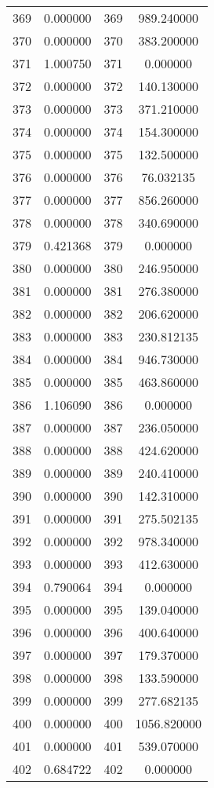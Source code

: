 \documentclass[12pt]{article}
\begin{document}
\begin{longtable}{@{}cccc@{}}
369 & 0.000000 & 369 & 989.240000 \\
370 & 0.000000 & 370 & 383.200000 \\
371 & 1.000750 & 371 & 0.000000 \\
372 & 0.000000 & 372 & 140.130000 \\
373 & 0.000000 & 373 & 371.210000 \\
374 & 0.000000 & 374 & 154.300000 \\
375 & 0.000000 & 375 & 132.500000 \\
376 & 0.000000 & 376 & 76.032135 \\
377 & 0.000000 & 377 & 856.260000 \\
378 & 0.000000 & 378 & 340.690000 \\
379 & 0.421368 & 379 & 0.000000 \\
380 & 0.000000 & 380 & 246.950000 \\
381 & 0.000000 & 381 & 276.380000 \\
382 & 0.000000 & 382 & 206.620000 \\
383 & 0.000000 & 383 & 230.812135 \\
384 & 0.000000 & 384 & 946.730000 \\
385 & 0.000000 & 385 & 463.860000 \\
386 & 1.106090 & 386 & 0.000000 \\
387 & 0.000000 & 387 & 236.050000 \\
388 & 0.000000 & 388 & 424.620000 \\
389 & 0.000000 & 389 & 240.410000 \\
390 & 0.000000 & 390 & 142.310000 \\
391 & 0.000000 & 391 & 275.502135 \\
392 & 0.000000 & 392 & 978.340000 \\
393 & 0.000000 & 393 & 412.630000 \\
394 & 0.790064 & 394 & 0.000000 \\
395 & 0.000000 & 395 & 139.040000 \\
396 & 0.000000 & 396 & 400.640000 \\
397 & 0.000000 & 397 & 179.370000 \\
398 & 0.000000 & 398 & 133.590000 \\
399 & 0.000000 & 399 & 277.682135 \\
400 & 0.000000 & 400 & 1056.820000 \\
401 & 0.000000 & 401 & 539.070000 \\
402 & 0.684722 & 402 & 0.000000 \\

\end{longtable}
\end{document}
